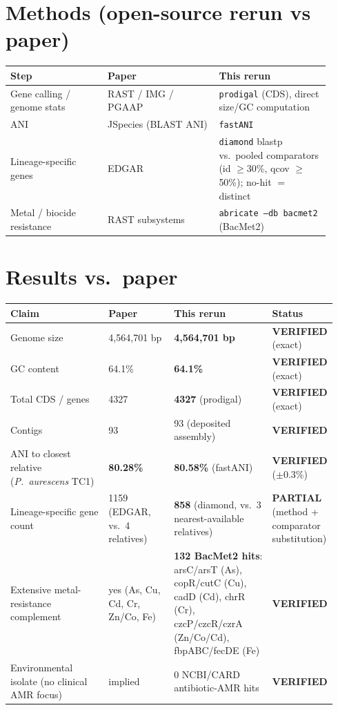 \documentclass[11pt]{article}
\begin{document}
\section{Methods (open-source rerun vs paper)}
\begin{longtable}{p{0.28\linewidth} p{0.32\linewidth} p{0.32\linewidth}}
\toprule
\textbf{Step} & \textbf{Paper} & \textbf{This rerun} \\
\midrule
Gene calling / genome stats & RAST / IMG / PGAAP & \texttt{prodigal} (CDS), direct size/GC computation \\
ANI                          & JSpecies (BLAST ANI) & \texttt{fastANI} \\
Lineage-specific genes       & EDGAR                & \texttt{diamond} blastp vs.\ pooled comparators (id $\geq$30\%, qcov $\geq$50\%); no-hit $=$ distinct \\
Metal / biocide resistance   & RAST subsystems      & \texttt{abricate --db bacmet2} (BacMet2) \\
\bottomrule
\end{longtable}

\section{Results vs.\ paper}
\begin{longtable}{p{0.30\linewidth} p{0.20\linewidth} p{0.30\linewidth} p{0.14\linewidth}}
\toprule
\textbf{Claim} & \textbf{Paper} & \textbf{This rerun} & \textbf{Status} \\
\midrule
Genome size & 4{,}564{,}701 bp & \textbf{4{,}564{,}701 bp} & \textbf{VERIFIED} (exact) \\
GC content & 64.1\% & \textbf{64.1\%} & \textbf{VERIFIED} (exact) \\
Total CDS / genes & 4327 & \textbf{4327} (prodigal) & \textbf{VERIFIED} (exact) \\
Contigs & 93 & 93 (deposited assembly) & \textbf{VERIFIED} \\
ANI to closest relative (\textit{P.\ aurescens} TC1) & \textbf{80.28\%} & \textbf{80.58\%} (fastANI) & \textbf{VERIFIED} ($\pm$0.3\%) \\
Lineage-specific gene count & 1159 (EDGAR, vs.\ 4 relatives) & \textbf{858} (diamond, vs.\ 3 nearest-available relatives) & \textbf{PARTIAL} (method + comparator substitution) \\
Extensive metal-resistance complement & yes (As, Cu, Cd, Cr, Zn/Co, Fe) & \textbf{132 BacMet2 hits}: arsC/arsT (As), copR/cutC (Cu), cadD (Cd), chrR (Cr), czcP/czcR/czrA (Zn/Co/Cd), fbpABC/fecDE (Fe) & \textbf{VERIFIED} \\
Environmental isolate (no clinical AMR focus) & implied & 0 NCBI/CARD antibiotic-AMR hits & \textbf{VERIFIED} \\
\bottomrule
\end{longtable}
\end{document}
